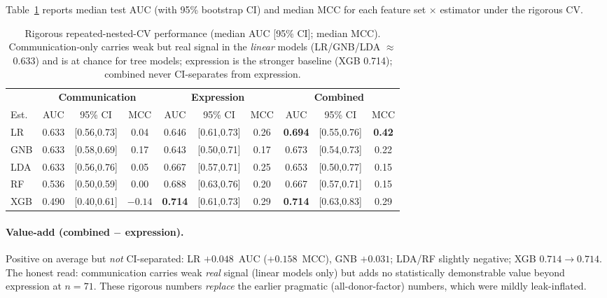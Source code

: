 \documentclass[11pt]{article}
\begin{document}
Table~\ref{tab:auc} reports median test AUC (with 95\% bootstrap CI) and median
MCC for each feature set $\times$ estimator under the rigorous CV.

\begin{table}[h]
\centering
\caption{Rigorous repeated-nested-CV performance (median AUC [95\% CI]; median
MCC). Communication-only carries weak but real signal in the \emph{linear}
models (LR/GNB/LDA $\approx$ 0.633) and is at chance for tree models; expression
is the stronger baseline (XGB 0.714); combined never CI-separates from
expression.}
\label{tab:auc}
\small
\setlength{\tabcolsep}{5pt}
\begin{tabular}{l ccc ccc ccc}
\toprule
& \multicolumn{3}{c}{\textbf{Communication}} &
  \multicolumn{3}{c}{\textbf{Expression}} &
  \multicolumn{3}{c}{\textbf{Combined}} \\
\cmidrule(lr){2-4}\cmidrule(lr){5-7}\cmidrule(lr){8-10}
Est. & AUC & 95\% CI & MCC & AUC & 95\% CI & MCC & AUC & 95\% CI & MCC \\
\midrule
LR  & 0.633 & [0.56,0.73] & 0.04 & 0.646 & [0.61,0.73] & 0.26 &
      \textbf{0.694} & [0.55,0.76] & \textbf{0.42} \\
GNB & 0.633 & [0.58,0.69] & 0.17 & 0.643 & [0.50,0.71] & 0.17 &
      0.673 & [0.54,0.73] & 0.22 \\
LDA & 0.633 & [0.56,0.76] & 0.05 & 0.667 & [0.57,0.71] & 0.25 &
      0.653 & [0.50,0.77] & 0.15 \\
RF  & 0.536 & [0.50,0.59] & 0.00 & 0.688 & [0.63,0.76] & 0.20 &
      0.667 & [0.57,0.71] & 0.15 \\
XGB & 0.490 & [0.40,0.61] & $-0.14$ & \textbf{0.714} & [0.61,0.73] & 0.29 &
      \textbf{0.714} & [0.63,0.83] & 0.29 \\
\bottomrule
\end{tabular}
\end{table}

\paragraph{Value-add (combined $-$ expression).} Positive on average but
\emph{not} CI-separated: LR $+0.048$~AUC ($+0.158$~MCC), GNB $+0.031$; LDA/RF
slightly negative; XGB $0.714\rightarrow0.714$. The honest read: communication
carries weak \emph{real} signal (linear models only) but adds no statistically
demonstrable value beyond expression at $n=71$. These rigorous numbers
\emph{replace} the earlier pragmatic (all-donor-factor) numbers, which were
mildly leak-inflated.
\end{document}

